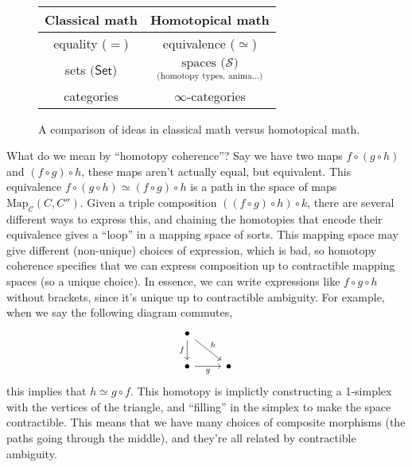 \begin{figure}
\centering
\begin{tabular}{|| c | c ||} 
    \hline
    Classical math & Homotopical math \\
    \hline\hline
    equality ($=$) & equivalence ($\simeq$)\\ \hline
    sets $(\mathsf{Set} $) & $\underset{\text{(homotopy types, anima...)}}{\text{spaces (}\mathcal{S} \text{)}} $\\ \hline
    categories & $\infty$-categories \\ \hline
\end{tabular}
\label{comparison}
\caption{A comparison of ideas in classical math versus homotopical math.} 
\end{figure}

What do we mean by ``homotopy coherence''? Say we have two maps $f \circ (g \circ h)$ and $(f \circ g) \circ h$, these maps aren't actually equal, but equivalent. This equivalence $f \circ (g \circ h) \simeq (f \circ g) \circ h$ is a path in the space of maps $\mathrm{Map }_{\mathcal{C} }(C,C'')$. Given a triple composition $((f \circ g) \circ h) \circ k$, there are several different ways to express this, and chaining the homotopies that encode their equivalence gives a ``loop'' in a mapping space of sorts. This mapping space may give different (non-unique) choices of expression, which is bad, so homotopy coherence specifies that we can express composition up to contractible mapping spaces (so a unique choice). In essence, we can write expressions like $f \circ g \circ h$ without brackets, since it's unique up to contractible ambiguity.
For example, when we say the following diagram commutes, \[
\begin{tikzcd}
    \bullet \arrow[d,"f"']\arrow[dr,"h"]& \\
    \bullet \arrow[r,"g"']& \bullet
\end{tikzcd}
\] this implies that $h\simeq g \circ f$. This homotopy is implictly constructing a 1-simplex with the vertices of the triangle, and ``filling'' in the simplex to make the space contractible. This means that we have many choices of composite morphisms (the paths going through the middle), and they're all related by contractible ambiguity.

